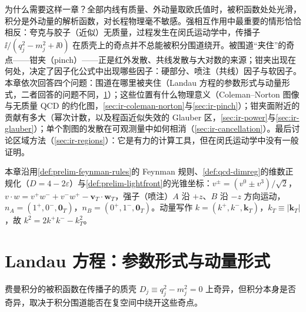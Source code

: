 为什么需要这样一章？全部内线有质量、外动量取欧氏值时，被积函数处处光滑，积分是外动量的解析函数，对长程物理毫不敏感。强相互作用中最重要的情形恰恰相反：夸克与胶子（近似）无质量，过程发生在闵氏运动学中，传播子 $\ii/(q_j^2-m_j^2+\ii0)$ 在质壳上的奇点并不总能被积分围道绕开。被围道“夹住”的奇点——钳夹（pinch）——正是红外发散、共线发散与大对数的来源；钳夹出现在何处，决定了因子化公式中出现哪些因子：硬部分、喷注（共线）因子与软因子。本章依次回答四个问题：围道在哪里被夹住（Landau 方程的参数形式与动量形式，二者回答的问题不同，\cref{sec:ir-landau}）；这些位置有什么物理意义（Coleman--Norton 图像与无质量 QCD 的约化图，\cref{sec:ir-coleman-norton}与\cref{sec:ir-pinch}）；钳夹面附近的贡献有多大（幂次计数，以及程函近似失效的 Glauber 区，\cref{sec:ir-power}与\cref{sec:ir-glauber}）；单个割图的发散在可观测量中如何相消（\cref{sec:ir-cancellation}）。最后讨论区域方法（\cref{sec:ir-regions}）：它是有力的计算工具，但在闵氏运动学中没有一般证明。

本章沿用\cref{def:prelim-feynman-rules}的 Feynman 规则、\cref{def:qcd-dimreg}的维数正规化（$D=4-2\varepsilon$）与\cref{def:prelim-lightfront}的光锥坐标：$v^\pm=(v^0\pm v^3)/\sqrt2$，$v\cdot w=v^+w^-+v^-w^+-\mathbf v_T\cdot\mathbf w_T$，强子（喷注）$A$ 沿 $+z$、$B$ 沿 $-z$ 方向运动，$n_A=(1^+,0^-,\mathbf 0_T)$，$n_B=(0^+,1^-,\mathbf 0_T)$。动量写作 $k=(k^+,k^-,\mathbf k_T)$，$k_T\equiv|\mathbf k_T|$，故 $k^2=2k^+k^--k_T^2$。
\section{Landau 方程：参数形式与动量形式}\label{sec:ir-landau}

费曼积分的被积函数在传播子的质壳 $D_j\equiv q_j^2-m_j^2=0$ 上奇异，但积分本身是否奇异，取决于积分围道能否在复空间中绕开这些奇点。

